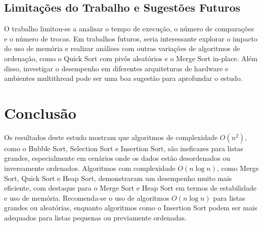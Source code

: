\documentclass[tcc2]{uftex}
\begin{document}
\section{Limitações do Trabalho e Sugestões Futuros}
O trabalho limitou-se a analisar o tempo de execução, o número de comparações e o número de trocas. Em trabalhos futuros, seria interessante explorar o impacto do uso de memória e realizar análises com outras variações de algoritmos de ordenação, como o Quick Sort com pivôs aleatórios e o Merge Sort in-place. Além disso, investigar o desempenho em diferentes arquiteturas de hardware e ambientes multithread pode ser uma boa sugestão para aprofundar o estudo.

\chapter{Conclusão}
Os resultados deste estudo mostram que algoritmos de complexidade \(O(n^2)\), como o Bubble Sort, Selection Sort e Insertion Sort, são ineficazes para listas grandes, especialmente em cenários onde os dados estão desordenados ou inversamente ordenados. Algoritmos com complexidade \(O(n \log ⁡n)\), como Merge Sort, Quick Sort e Heap Sort, demonstraram um desempenho muito mais eficiente, com destaque para o Merge Sort e Heap Sort em termos de estabilidade e uso de memória. Recomenda-se o uso de algoritmos \(O(n \log⁡ n)\) para listas grandes ou aleatórias, enquanto algoritmos como o Insertion Sort podem ser mais adequados para listas pequenas ou previamente ordenadas.

\backmatter 
\singlespacing   

\end{document}
